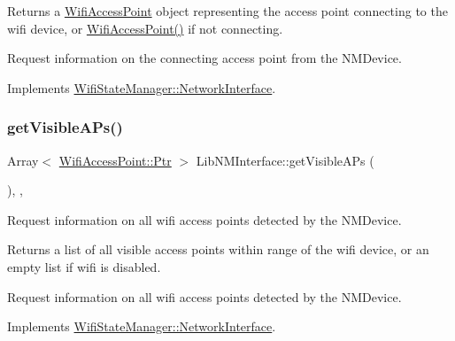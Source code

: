 \begin{DoxyReturn}{Returns}
a \mbox{\hyperlink{classWifiAccessPoint}{Wifi\+Access\+Point}} object representing the access point connecting to the wifi device, or \mbox{\hyperlink{classWifiAccessPoint}{Wifi\+Access\+Point()}} if not connecting.
\end{DoxyReturn}
Request information on the connecting access point from the N\+M\+Device. 

Implements \mbox{\hyperlink{classWifiStateManager_1_1NetworkInterface_abff4fdeee0026c367dccc03828a88cc2}{Wifi\+State\+Manager\+::\+Network\+Interface}}.

\mbox{\label{classLibNMInterface_a52834cf27d1d7ea06939695c9caebca1}} 
\subsubsection{\texorpdfstring{get\+Visible\+A\+Ps()}{getVisibleAPs()}}
{\footnotesize\ttfamily Array$<$ \mbox{\hyperlink{classWifiAccessPoint_ad18977f884076774803027efbaa131a0}{Wifi\+Access\+Point\+::\+Ptr}} $>$ Lib\+N\+M\+Interface\+::get\+Visible\+A\+Ps (\begin{DoxyParamCaption}{ }\end{DoxyParamCaption})\hspace{0.3cm}{\ttfamily [override]}, {\ttfamily [protected]}, {\ttfamily [virtual]}}

Request information on all wifi access points detected by the N\+M\+Device.

\begin{DoxyReturn}{Returns}
a list of all visible access points within range of the wifi device, or an empty list if wifi is disabled.
\end{DoxyReturn}
Request information on all wifi access points detected by the N\+M\+Device. 

Implements \mbox{\hyperlink{classWifiStateManager_1_1NetworkInterface_a898004009e9645ad96a777ca2ee6a245}{Wifi\+State\+Manager\+::\+Network\+Interface}}.

\mbox{\label{classLibNMInterface_afb02b052a8c2a67ce2865d3faf689c39}} 
